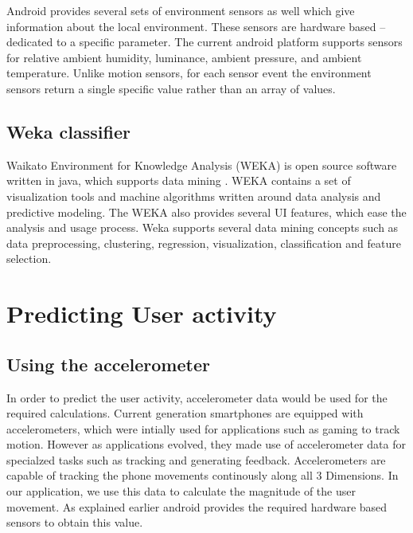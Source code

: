 \documentclass[conference]{IEEEtran}
\begin{document}
Android provides several sets of environment sensors as well which give information about the local environment. These sensors are hardware based – dedicated to a specific parameter. The current android platform supports sensors for relative ambient humidity, luminance, ambient pressure, and ambient temperature. Unlike motion sensors, for each sensor event the environment sensors return a single specific value rather than an array of values.


\subsection{Weka classifier}
Waikato Environment for Knowledge Analysis (WEKA) is open source software written in java, which supports data mining \cite{ref12}. WEKA contains a set of visualization tools and machine algorithms written around data analysis and predictive modeling. The WEKA also provides several UI features, which ease the analysis and usage process. Weka supports several data mining concepts such as data preprocessing, clustering, regression, visualization, classification and feature selection.
\section{Predicting User activity}

\subsection{Using the accelerometer}

In order to predict the user activity, accelerometer data would be used for the required calculations. Current generation smartphones are equipped with accelerometers, which were intially used for applications such as gaming to track motion. However as applications evolved, they made use of accelerometer data for specialzed tasks such as tracking and generating feedback. Accelerometers are capable of tracking the phone movements continously along all 3 Dimensions. In our application, we use this data to calculate the magnitude of the user movement. As explained earlier android provides the required hardware based sensors to obtain this value. 
\end{document}
